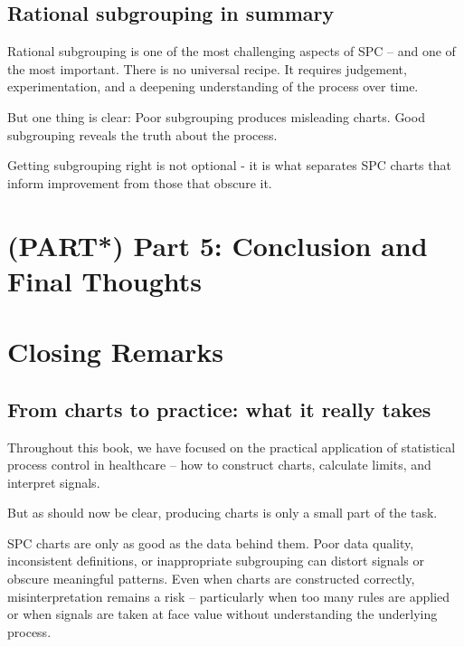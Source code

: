 \documentclass[
]{book}
\begin{document}
\section{Rational subgrouping in
summary}\label{rational-subgrouping-in-summary}

Rational subgrouping is one of the most challenging aspects of SPC --
and one of the most important. There is no universal recipe. It requires
judgement, experimentation, and a deepening understanding of the process
over time.

But one thing is clear: Poor subgrouping produces misleading charts.
Good subgrouping reveals the truth about the process.

Getting subgrouping right is not optional - it is what separates SPC
charts that inform improvement from those that obscure it.

\chapter*{(PART*) Part 5: Conclusion and Final
Thoughts}\label{part-part-5-conclusion-and-final-thoughts}

\chapter{Closing Remarks}\label{closing-remarks}

\section{From charts to practice: what it really
takes}\label{from-charts-to-practice-what-it-really-takes}

Throughout this book, we have focused on the practical application of
statistical process control in healthcare -- how to construct charts,
calculate limits, and interpret signals.

But as should now be clear, producing charts is only a small part of the
task.

SPC charts are only as good as the data behind them. Poor data quality,
inconsistent definitions, or inappropriate subgrouping can distort
signals or obscure meaningful patterns. Even when charts are constructed
correctly, misinterpretation remains a risk -- particularly when too
many rules are applied or when signals are taken at face value without
understanding the underlying process.
\end{document}
